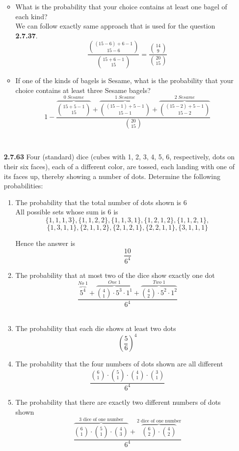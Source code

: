 \documentclass[12pt]{article}
\begin{document}
\begin{itemize}
    \begin{itemize}
        \item What is the probability that your choice contains at least one bagel of each kind?\\
        
        We can follow exactly same approach that is used for the question \textbf{2.7.37}.
        $$\frac{\binom{(15-6)+6-1}{15-6}}{\binom{15+6-1}{15}}=\frac{\binom{14}{9}}{\binom{20}{15}}$$
        
        \item If one of the kinds of bagels is Sesame, what is the probability that your choice contains at least three Sesame bagels?
        $$1-\frac{\overbrace{\binom{15+5-1}{15}}^{0\; Sesame}+\overbrace{\binom{(15-1)+5-1}{15-1}}^{1\;Sesame}+\overbrace{\binom{(15-2)+5-1}{15-2}}^{2\;Sesame}}{\binom{20}{15}}$$
    \end{itemize}
     \\
    
    \item[\bf 2.7.63] Four (standard) dice (cubes with 1, 2, 3, 4, 5, 6, respectively, dots on their six faces), each of a different color, are tossed, each landing with one of its faces up, thereby showing a number of dots. Determine the following probabilities:
    \begin{enumerate}[label=(\alph*)]
        \item The probability that the total number of dots shown is 6\\
        
        All possible sets whose sum is 6 is
        $$\{1,1,1,3\},\{1,1,2,2\},\{1,1,3,1\},\{1,2,1,2\},\{1,1,2,1\},$$
        $$\{1,3,1,1\},\{2,1,1,2\},\{2,1,2,1\},\{2,2,1,1\},\{3,1,1,1\}$$
        
        Hence the answer is $$\frac{10}{6^4}$$
        \item The probability that at most two of the dice show exactly one dot
        $$\frac{\overbrace{5^4}^{No\; 1}+ \overbrace{\binom{4}{1}\cdot 5^3\cdot 1^1}^{One\; 1}+ \overbrace{\binom{4}{2}\cdot 5^2\cdot 1^2}^{Two\; 1}}{6^4}$$\\
        
        \item The probability that each die shows at least two dots
        $$\left(\frac{5}{6}\right)^4$$
        \item The probability that the four numbers of dots shown are all different
        $$\frac{\binom{6}{1}\cdot\binom{5}{1}\cdot\binom{4}{1}\cdot\binom{3}{1}}{6^4}$$
        \item The probability that there are exactly two different numbers of dots shown\\
        $$\frac{\overbrace{\binom{6}{1}\cdot \binom{5}{1}\cdot \binom{4}{3}}^{\text{3 dice of one number}} + \overbrace{\binom{6}{2}\cdot\binom{4}{2}}^{\text{2 dice of one number}}}{6^4}$$
    \end{enumerate}
    
\end{itemize}
\end{document}
